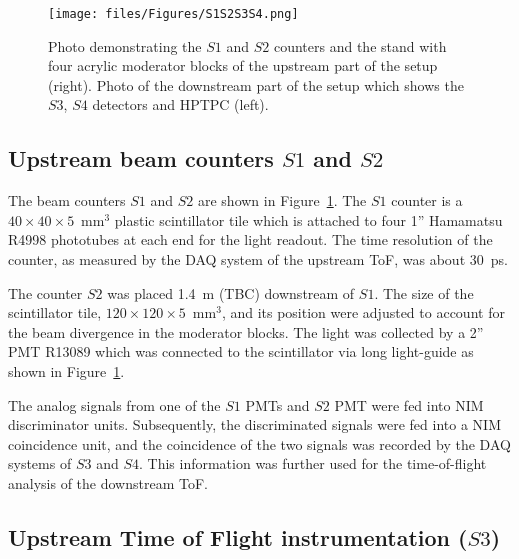    
    \begin{figure}[t]
      \centering
    \texttt{[image: files/Figures/S1S2S3S4.png]}
    	\caption{Photo demonstrating the $S1$ and $S2$ counters and the stand with four acrylic moderator blocks of the upstream part of the setup (right). Photo of the downstream part of the setup which shows the $S3$, $S4$ detectors and HPTPC (left).}
    		\label{fig:modblocks}
    \end{figure}
    
    
	\subsection{Upstream beam counters $S1$ and $S2$}
	
	The beam counters $S1$ and $S2$ are shown in Figure~\ref{fig:modblocks}. The $S1$ counter is a $40\times40\times5$~mm$^3$ plastic scintillator tile which is attached to four 1'' Hamamatsu R4998 phototubes at each end for the light readout. The time resolution of the counter, as measured by the DAQ system of the upstream ToF, was about 30~ps. 
	
	The counter $S2$ was placed 1.4~m (TBC) downstream of $S1$. The size of the scintillator tile, $120\times120\times5$~mm$^3$, and its position were adjusted to account for the beam divergence in the moderator blocks. The light was collected by a 2'' PMT R13089 which was connected to the scintillator via long light-guide as shown in Figure~\ref{fig:modblocks}. 
	
	The analog signals from one of the $S1$ PMTs and $S2$ PMT were fed into NIM discriminator units.
	Subsequently, the discriminated signals were fed into a NIM coincidence unit, and the coincidence of the two signals was recorded by the DAQ systems of $S3$ and $S4$. This information was further used for the time-of-flight analysis of the downstream ToF. 

    
\subsection{Upstream Time of Flight instrumentation ($S3$)}

